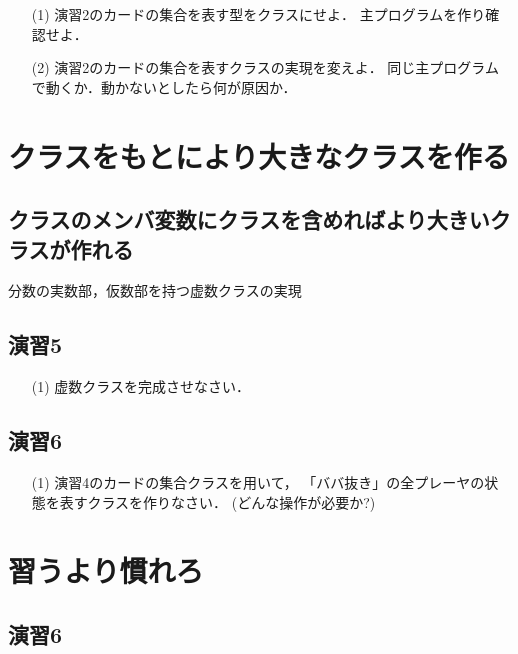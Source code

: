 \begin{enumerate}

 \item[(1)] 演習2のカードの集合を表す型をクラスにせよ．
主プログラムを作り確認せよ．

 \item[(2)] 演習2のカードの集合を表すクラスの実現を変えよ．
同じ主プログラムで動くか．動かないとしたら何が原因か．

\end{enumerate}

\section{クラスをもとにより大きなクラスを作る}

\subsection{クラスのメンバ変数にクラスを含めればより大きいクラスが作れる}

分数の実数部，仮数部を持つ虚数クラスの実現

\subsection{演習5}

\begin{enumerate}

 \item[(1)] 虚数クラスを完成させなさい．

\end{enumerate}

\subsection{演習6}

\begin{enumerate}

 \item[(1)] 演習4のカードの集合クラスを用いて，
「ババ抜き」の全プレーヤの状態を表すクラスを作りなさい．
(どんな操作が必要か?)

\end{enumerate}

\section{習うより慣れろ}

\subsection{演習6}

